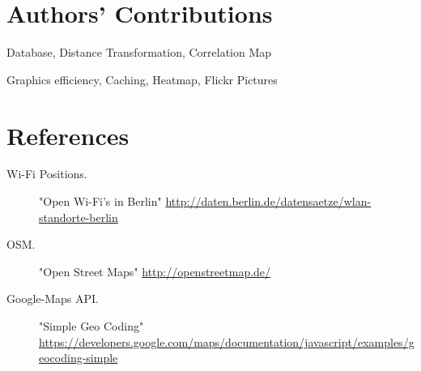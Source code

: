 \section*{Authors' Contributions}

\begin{description}
\setlength{\itemsep}{0pt}
  \item[Andreas Ergenzinger] Database, Distance Transformation, Correlation Map
  \item[Josua Krause] Graphics efficiency, Caching, Heatmap, Flickr Pictures
\end{description}

\section*{References}

\begin{description}
\item[Wi-Fi Positions.] "Open Wi-Fi's in Berlin" 
  \url{http://daten.berlin.de/datensaetze/wlan-standorte-berlin}
\item[OSM.] "Open Street Maps" 
  \url{http://openstreetmap.de/}
\item[Google-Maps API.] "Simple Geo Coding"
  \url{https://developers.google.com/maps/documentation/javascript/examples/geocoding-simple} 
\end{description}
